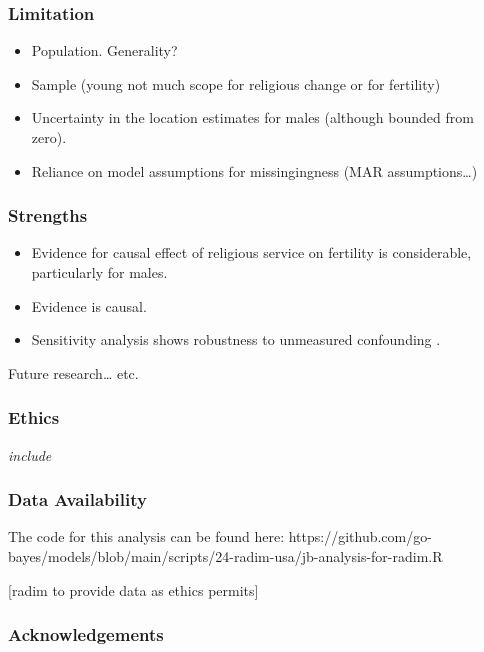\documentclass[
  single column]{article}
\providecommand{\tightlist}{%
  \setlength{\itemsep}{0pt}\setlength{\parskip}{0pt}}\usepackage{longtable,booktabs,array}
\begin{document}
\subsubsection{Limitation}\label{limitation}

\begin{itemize}
\tightlist
\item
  Population. Generality?
\item
  Sample (young not much scope for religious change or for fertility)
\item
  Uncertainty in the location estimates for males (although bounded from
  zero).
\item
  Reliance on model assumptions for missingingness (MAR
  assumptions\ldots)
\end{itemize}

\subsubsection{Strengths}\label{strengths}

\begin{itemize}
\tightlist
\item
  Evidence for causal effect of religious service on fertility is
  considerable, particularly for males.
\item
  Evidence is causal.
\item
  Sensitivity analysis shows robustness to unmeasured confounding .
\end{itemize}

Future research\ldots{} etc.

\newpage{}

\subsubsection{Ethics}\label{ethics}

\emph{include}

\subsubsection{Data Availability}\label{data-availability}

The code for this analysis can be found here:
https://github.com/go-bayes/models/blob/main/scripts/24-radim-usa/jb-analysis-for-radim.R

{[}radim to provide data as ethics permits{]}

\subsubsection{Acknowledgements}\label{acknowledgements}
\end{document}

